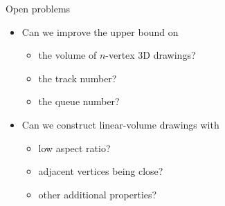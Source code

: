\documentclass[t]{beamer}
\begin{document}
    \begin{frame}{Open problems}
    \begin{itemize}
	    \pause
	\item Can we improve the upper bound on
	    \begin{itemize}
		    \pause
		\item the volume of $n$-vertex 3D drawings?
		    \pause
		\item the track number?
		    \pause
		\item the queue number?
	    \end{itemize}
	\item Can we construct linear-volume drawings with 
	    \pause
	    \begin{itemize}
		\item low aspect ratio?
		    \pause
		\item adjacent vertices being close?
		    \pause
		\item other additional properties?
	    \end{itemize}
    \end{itemize}
\end{frame}

\bgroup
{}
\begin{frame}[plain]{}
\end{frame}
\egroup
\end{document}
